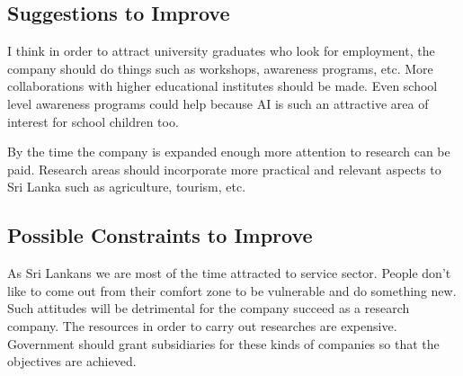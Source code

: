 \subsection{Suggestions to Improve}
I think in order to attract university graduates who look for employment, the company should do things such as workshops, awareness programs, etc. More collaborations with higher educational institutes should be made. Even school level awareness programs could help because AI is such an attractive area of interest for school children too.

By the time the company is expanded enough more attention to research can be paid. Research areas should incorporate more practical and relevant aspects to Sri Lanka such as agriculture, tourism, etc. 

\subsection{Possible Constraints to Improve}
As Sri Lankans we are most of the time attracted to service sector. People don't like to come out from their comfort zone to be vulnerable and do something new. Such attitudes will be detrimental for the company succeed as a research company. The resources in order to carry out researches are expensive. Government should grant subsidiaries for these kinds of companies so that the objectives are achieved.